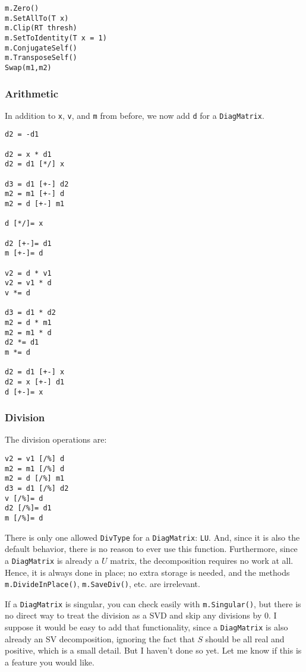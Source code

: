 \documentclass[twoside,letterpaper,11pt]{article}
\renewcommand{\tt}[1]{{\texttt {#1}}}
\begin{document}
\begin{verbatim}
m.Zero()
m.SetAllTo(T x)
m.Clip(RT thresh)
m.SetToIdentity(T x = 1)
m.ConjugateSelf()
m.TransposeSelf()
Swap(m1,m2)
\end{verbatim}

\subsubsection{Arithmetic}

In addition to \tt{x}, \tt{v}, and \tt{m} from before, we now add \tt{d} for a \tt{DiagMatrix}.

\begin{verbatim}
d2 = -d1

d2 = x * d1
d2 = d1 [*/] x

d3 = d1 [+-] d2
m2 = m1 [+-] d
m2 = d [+-] m1

d [*/]= x

d2 [+-]= d1
m [+-]= d

v2 = d * v1
v2 = v1 * d
v *= d

d3 = d1 * d2
m2 = d * m1
m2 = m1 * d
d2 *= d1
m *= d

d2 = d1 [+-] x
d2 = x [+-] d1
d [+-]= x
\end{verbatim}

\subsubsection{Division}

The division operations are:
\begin{verbatim}
v2 = v1 [/%] d
m2 = m1 [/%] d
m2 = d [/%] m1
d3 = d1 [/%] d2
v [/%]= d
d2 [/%]= d1
m [/%]= d
\end{verbatim}

There is only one allowed \tt{DivType} for a \tt{DiagMatrix}: \tt{LU}. 
And, since it is also the default behavior,
there is no reason to ever use this function.  Furthermore, since a \tt{DiagMatrix}
is already a $U$ matrix, the decomposition requires no work at all.
Hence, it is always done in place; no extra storage is needed, and 
the methods \tt{m.DivideInPlace()}, \tt{m.SaveDiv()}, etc. are irrelevant.

If a \tt{DiagMatrix} is singular, you can check easily with \tt{m.Singular()},
but there is no direct way to treat the division as a SVD and skip any
divisions by 0.  I suppose it would be easy to add that functionality, since a 
\tt{DiagMatrix} is also already an SV decomposition, ignoring the fact that
$S$ should be all real and positive, which is a small detail.  But
I haven't done so yet.  Let me know if this is a feature you would like.
\end{document}
